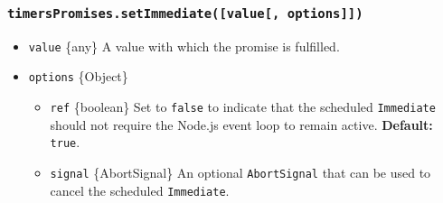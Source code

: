 \begin{Shaded}
\begin{Highlighting}[]
\NormalTok{ \{}
\OperatorTok{,}
\NormalTok{\} }\OperatorTok{=} \NormalTok{(}\NormalTok{)}\OperatorTok{;}

\NormalTok{(}\OperatorTok{,} \NormalTok{)}\KeywordTok{=\textgreater{}}\NormalTok{ \{}
  \OperatorTok{;}  
\NormalTok{\})}\OperatorTok{;}
\end{Highlighting}
\end{Shaded}

\subsubsection{\texorpdfstring{\texttt{timersPromises.setImmediate({[}value{[},\ options{]}{]})}}{timersPromises.setImmediate({[}value{[}, options{]}{]})}}\label{timerspromises.setimmediatevalue-options}

\begin{itemize}
\tightlist
\item
  \texttt{value} \{any\} A value with which the promise is fulfilled.
\item
  \texttt{options} \{Object\}

  \begin{itemize}
  \tightlist
  \item
    \texttt{ref} \{boolean\} Set to \texttt{false} to indicate that the
    scheduled \texttt{Immediate} should not require the Node.js event
    loop to remain active. \textbf{Default:} \texttt{true}.
  \item
    \texttt{signal} \{AbortSignal\} An optional \texttt{AbortSignal}
    that can be used to cancel the scheduled \texttt{Immediate}.
  \end{itemize}
\end{itemize}

\begin{Shaded}
\begin{Highlighting}[]
\NormalTok{ \{}
\OperatorTok{,}
\NormalTok{\} } \OperatorTok{;}

\OperatorTok{=}  \NormalTok{(}\NormalTok{)}\OperatorTok{;}

\OperatorTok{;}  
\end{Highlighting}
\end{Shaded}

